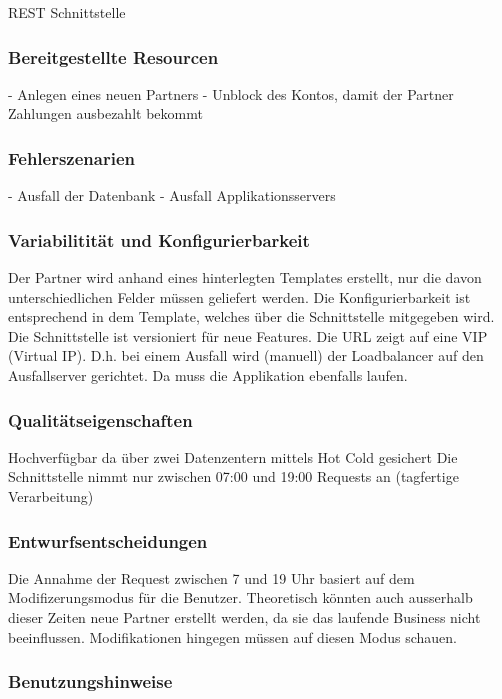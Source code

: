 REST Schnittstelle

\subsubsection{Bereitgestellte Resourcen}

- Anlegen eines neuen Partners
- Unblock des Kontos, damit der Partner Zahlungen ausbezahlt bekommt

\subsubsection{Fehlerszenarien}

- Ausfall der Datenbank
- Ausfall Applikationsservers
	
\subsubsection{Variabilitität und Konfigurierbarkeit}

Der Partner wird anhand eines hinterlegten Templates erstellt, nur die davon unterschiedlichen Felder müssen geliefert werden. Die Konfigurierbarkeit ist entsprechend in dem Template, welches über die Schnittstelle mitgegeben wird. Die Schnittstelle ist versioniert für neue Features.
Die URL zeigt auf eine VIP (Virtual IP). D.h. bei einem Ausfall wird (manuell) der Loadbalancer auf den Ausfallserver gerichtet. Da muss die Applikation ebenfalls laufen.

\subsubsection{Qualitätseigenschaften}

Hochverfügbar da über zwei Datenzentern mittels Hot Cold gesichert
Die Schnittstelle nimmt nur zwischen 07:00 und 19:00 Requests an (tagfertige Verarbeitung)
	
\subsubsection{Entwurfsentscheidungen} 

Die Annahme der Request zwischen 7 und 19 Uhr basiert auf dem Modifizerungsmodus für die Benutzer. Theoretisch könnten auch ausserhalb dieser Zeiten neue Partner erstellt werden, da sie das laufende Business nicht beeinflussen. Modifikationen hingegen müssen auf diesen Modus schauen.

\subsubsection{Benutzungshinweise} 

